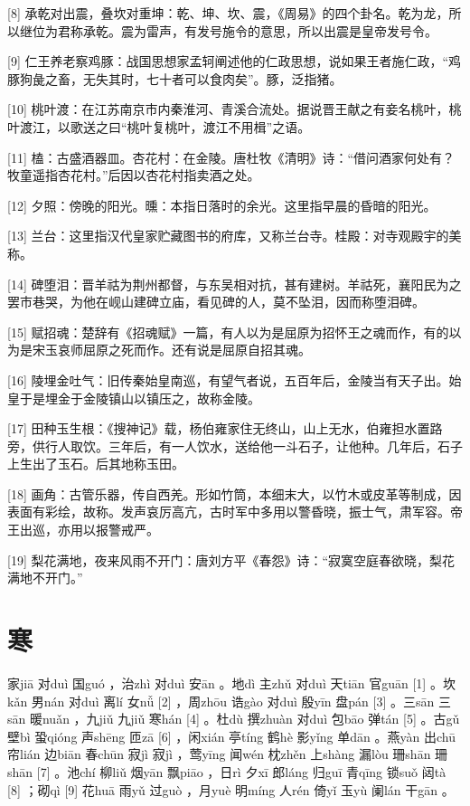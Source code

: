 \documentclass[12pt,UTF8]{ctexbook}
\begin{document}
[8] 承乾对出震，叠坎对重坤：乾、坤、坎、震，《周易》的四个卦名。乾为龙，所以继位为君称承乾。震为雷声，有发号施令的意思，所以出震是皇帝发号令。

[9] 仁王养老察鸡豚：战国思想家孟轲阐述他的仁政思想，说如果王者施仁政，“鸡豚狗彘之畜，无失其时，七十者可以食肉矣”。豚，泛指猪。

[10] 桃叶渡：在江苏南京市内秦淮河、青溪合流处。据说晋王献之有妾名桃叶，桃叶渡江，以歌送之曰“桃叶复桃叶，渡江不用楫”之语。

[11] 榼：古盛酒器皿。杏花村：在金陵。唐杜牧《清明》诗：“借问酒家何处有？牧童遥指杏花村。”后因以杏花村指卖酒之处。

[12] 夕照：傍晚的阳光。曛：本指日落时的余光。这里指早晨的昏暗的阳光。

[13] 兰台：这里指汉代皇家贮藏图书的府库，又称兰台寺。桂殿：对寺观殿宇的美称。

[14] 碑堕泪：晋羊祜为荆州都督，与东吴相对抗，甚有建树。羊祜死，襄阳民为之罢巿巷哭，为他在岘山建碑立庙，看见碑的人，莫不坠泪，因而称堕泪碑。

[15] 赋招魂：楚辞有《招魂赋》一篇，有人以为是屈原为招怀王之魂而作，有的以为是宋玉哀师屈原之死而作。还有说是屈原自招其魂。

[16] 陵埋金吐气：旧传秦始皇南巡，有望气者说，五百年后，金陵当有天子出。始皇于是埋金于金陵镇山以镇压之，故称金陵。

[17] 田种玉生根：《搜神记》载，杨伯雍家住无终山，山上无水，伯雍担水置路旁，供行人取饮。三年后，有一人饮水，送给他一斗石子，让他种。几年后，石子上生出了玉石。后其地称玉田。

[18] 画角：古管乐器，传自西羌。形如竹筒，本细末大，以竹木或皮革等制成，因表面有彩绘，故称。发声哀厉高亢，古时军中多用以警昏晓，振士气，肃军容。帝王出巡，亦用以报警戒严。

[19] 梨花满地，夜来风雨不开门：唐刘方平《春怨》诗：“寂寞空庭春欲晓，梨花满地不开门。”





\chapter{寒}


家jiā 对duì 国guó ，治zhì 对duì 安ān 。地dì 主zhǔ 对duì 天tiān 官guān [1] 。坎kǎn 男nán 对duì 离lí 女nǚ [2] ，周zhōu 诰gào 对duì 殷yīn 盘pán [3] 。三sān 三sān 暖nuǎn ，九jiǔ 九jiǔ 寒hán [4] 。杜dù 撰zhuàn 对duì 包bāo 弹tán [5] 。古gǔ 壁bì 蛩qióng 声shēng 匝zā [6] ，闲xián 亭tíng 鹤hè 影yǐng 单dān 。燕yàn 出chū 帘lián 边biān 春chūn 寂jì 寂jì ，莺yīng 闻wén 枕zhěn 上shàng 漏lòu 珊shān 珊shān [7] 。池chí 柳liǔ 烟yān 飘piāo ，日rì 夕xī 郎láng 归guī 青qīng 锁suǒ 闼tà [8] ；砌qì [9] 花huā 雨yǔ 过guò ，月yuè 明míng 人rén 倚yǐ 玉yù 阑lán 干gān 。
\end{document}

